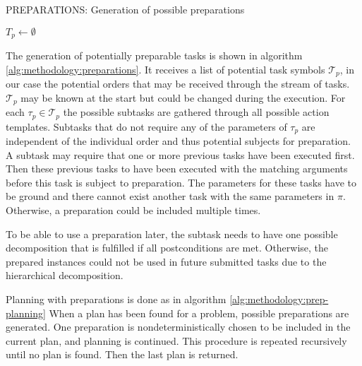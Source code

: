 \begin{algorithm}
    \caption{PREPARATIONS: Generation of possible preparations}
    \label{alg:methodology:preparations}
    $T_p \leftarrow \emptyset$\;
\end{algorithm}

The generation of potentially preparable tasks is shown in algorithm \ref{alg:methodology:preparations}.
It receives a list of potential task symbols $\mathcal{T}_p$, in our case the potential orders that may be received through the stream of tasks.
$\mathcal{T}_p$ may be known at the start but could be changed during the execution.
For each $\tau_p \in \mathcal{T}_p$ the possible subtasks are gathered through all possible action templates.
Subtasks that do not require any of the parameters of $\tau_p$ are independent of the individual order and thus potential subjects for preparation.
A subtask may require that one or more previous tasks have been executed first.
Then these previous tasks to have been executed with the matching arguments before this task is subject to preparation.
The parameters for these tasks have to be ground and there cannot exist another task with the same parameters in $\pi$.
Otherwise, a preparation could be included multiple times.

To be able to use a preparation later, the subtask needs to have one possible decomposition that is fulfilled if all postconditions are met.
Otherwise, the prepared instances could not be used in future submitted tasks due to the hierarchical decomposition.


Planning with preparations is done as in algorithm \ref{alg:methodology:prep-planning}
When a plan has been found for a problem, possible preparations are generated.
One preparation is nondeterministically chosen to be included in the current plan, and planning is continued.
This procedure is repeated recursively until no plan is found.
Then the last plan is returned.

